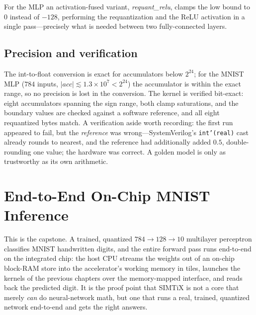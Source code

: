 \documentclass[12pt,a4paper,oneside]{report}
\newcommand{\code}[1]{\texttt{#1}}
\begin{document}
For the MLP an activation-fused variant, \emph{requant\_relu}, clamps the low bound
to $0$ instead of $-128$, performing the requantization and the ReLU activation in
a single pass---precisely what is needed between two fully-connected layers.

\section{Precision and verification}
The int-to-float conversion is exact for accumulators below $2^{24}$; for the MNIST
MLP ($784$ inputs, $|\mathit{acc}|\lesssim 1.3\times 10^{7}<2^{24}$) the accumulator
is within the exact range, so no precision is lost in the conversion. The kernel is
verified bit-exact: eight accumulators spanning the sign range, both clamp
saturations, and the boundary values are checked against a software reference, and
all eight requantized bytes match. A verification aside worth recording: the first
run appeared to fail, but the \emph{reference} was wrong---SystemVerilog's
\code{int'(real)} cast already rounds to nearest, and the reference had additionally
added $0.5$, double-rounding one value; the hardware was correct. A golden model is
only as trustworthy as its own arithmetic.

\chapter{End-to-End On-Chip MNIST Inference}
\label{ch:mnist}

This is the capstone. A trained, quantized $784{\rightarrow}128{\rightarrow}10$
multilayer perceptron classifies MNIST handwritten digits, and the entire forward
pass runs end-to-end on the integrated chip: the host CPU streams the weights out
of an on-chip block-RAM store into the accelerator's working memory in tiles,
launches the kernels of the previous chapters over the memory-mapped interface, and
reads back the predicted digit. It is the proof point that SIMTiX is not a core that
merely \emph{can} do neural-network math, but one that runs a real, trained,
quantized network end-to-end and gets the right answers.
\end{document}
